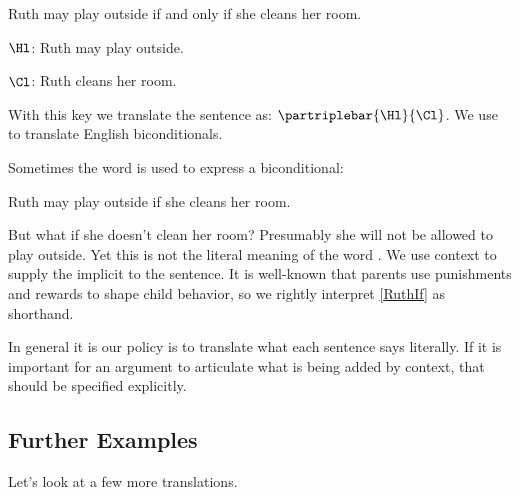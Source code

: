 \begin{menumerate}
	\item Ruth may play outside if and only if she cleans her room.
\end{menumerate}

	\begin{description}[itemsep=0em]
		\item[Translation Key:] \hfill{} 
		\begin{description}[itemsep=0em]
			\item $\Hl$: Ruth may play outside.
			\item $\Cl$: Ruth cleans her room.
		\end{description} 
	\end{description}

\noindent{}With this key we translate the sentence as: $\partriplebar{\Hl}{\Cl}$.
We use \mention{$\TRIPLEBAR$} to translate English biconditionals.

Sometimes the word  is used to express a biconditional:

\begin{menumerate}
	\item\label{RuthIf} Ruth may play outside if she cleans her room.
\end{menumerate}

\noindent{}But what if she doesn't clean her room?
Presumably she will not be allowed to play outside.
Yet this is not the literal meaning of the word .
We use context to supply the implicit  to the sentence.
It is well-known that parents use punishments and rewards to shape child behavior, so we rightly interpret \ref{RuthIf} as shorthand.

In general it is our policy is to translate what each sentence says literally.
If it is important for an argument to articulate what is being added by context, that should be specified explicitly.

\subsection{Further Examples}\label{GSLTransExamples}

Let's look at a few more translations.

